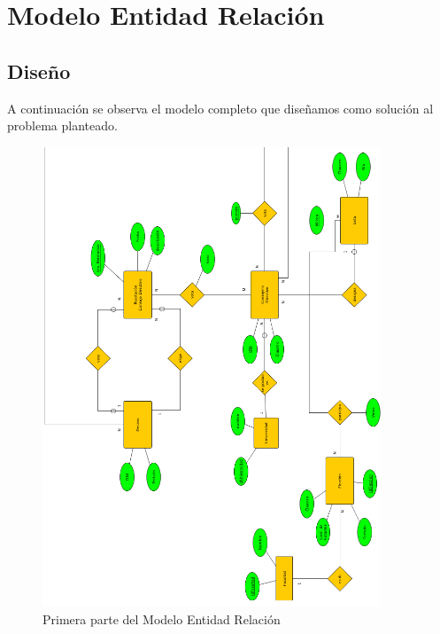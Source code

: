 \section{Modelo Entidad Relación}
\subsection{Diseño}
A continuación se observa el modelo completo que diseñamos como solución al problema planteado.

\begin{figure}[h!]
  \centering
  \includegraphics[width=0.9\textwidth]{./images/der1}
  \caption{Primera parte del Modelo Entidad Relación}
  \label{fig:clases4}
\end{figure}

